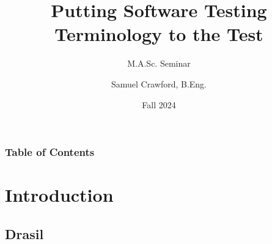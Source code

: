 \documentclass{beamer}
\title[Testing Terminology]{Putting Software Testing Terminology to the Test}
\subtitle{M.A.Sc. Seminar}
\author[Samuel Crawford]{Samuel Crawford, B.Eng.}
\institute[McMaster University]{McMaster University\\Department of Computing and Software}
\date{Fall 2024}
\begin{document}

\frame{\titlepage}


\begin{frame}
    \frametitle{Table of Contents}
    \tableofcontents
\end{frame}

\section{Introduction}
\subsection{Drasil}
\end{document}
